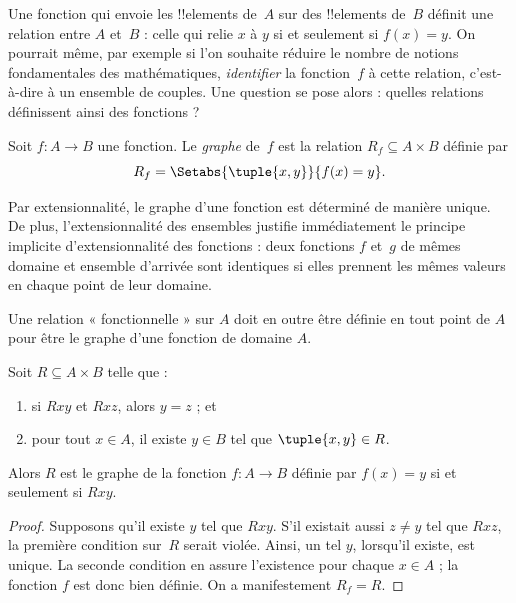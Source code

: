 \documentclass[../../../include/open-logic-section]{subfiles}
\begin{document}


\begin{explain}
Une fonction qui envoie les !!{element}s de~$A$ sur des !!{element}s de~$B$
définit une relation entre $A$ et~$B$ : celle qui relie $x$ à $y$ si et
seulement si $f(x) = y$. On pourrait même, par exemple si l’on souhaite
réduire le nombre de notions fondamentales des mathématiques,
\emph{identifier} la fonction~$f$ à cette relation, c’est-à-dire à un
ensemble de couples. Une question se pose alors : quelles relations
définissent ainsi des fonctions ?
\end{explain}

\begin{defn} Soit $f\colon A \to B$ une fonction.
Le \emph{graphe} de~$f$ est la relation $R_f \subseteq A \times B$
définie par
\[
R_f = \Setabs{\tuple{x,y}}{f(x) = y}.
\]
\end{defn}

\begin{explain}
Par extensionnalité, le graphe d’une fonction est déterminé de manière
unique. De plus, l’extensionnalité des ensembles justifie immédiatement
le principe implicite d’extensionnalité des fonctions : deux fonctions
$f$ et~$g$ de mêmes domaine et ensemble d’arrivée sont identiques si
elles prennent les mêmes valeurs en chaque point de leur domaine.

Une relation « fonctionnelle » sur $A$ doit en outre être définie en tout point de $A$ pour être le graphe d’une fonction de domaine $A$.
\end{explain}

\begin{prop}
Soit $R \subseteq A \times B$ telle que :
\begin{enumerate}
\item si $Rxy$ et $Rxz$, alors $y = z$ ; et
\item pour tout $x \in A$, il existe $y \in B$ tel que
$\tuple{x,y} \in R$.
\end{enumerate}
Alors $R$ est le graphe de la fonction $f\colon A \to B$ définie par
$f(x) = y$ si et seulement si $Rxy$.
\end{prop}

\begin{proof}
Supposons qu’il existe $y$ tel que $Rxy$. S’il existait aussi $z \neq y$
tel que $Rxz$, la première condition sur~$R$ serait violée. Ainsi, un tel
$y$, lorsqu’il existe, est unique. La seconde condition en assure
l’existence pour chaque $x \in A$ ; la fonction $f$ est donc bien définie.
On a manifestement $R_f = R$.
\end{proof}
\end{document}
